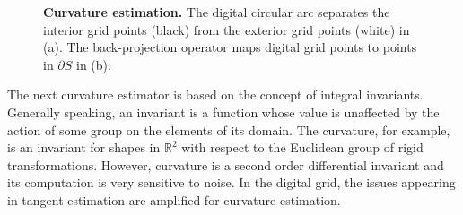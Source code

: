 \begin{figure}
\center
{}\hspace{1em}
\caption{\textbf{Curvature estimation.} The digital circular arc separates the interior grid points (black) from the exterior grid points (white) in (a). The back-projection operator maps digital grid points to points in $\partial S$ in (b). }
\end{figure}

The next curvature estimator is based on the concept of integral invariants. Generally speaking, an invariant is a function whose value is unaffected by the action of some group on the elements of its domain. The curvature, for example, is an invariant for shapes in $\mathbb{R}^2$ with respect to the Euclidean group of rigid transformations. However, curvature is a second order differential invariant and its computation is very sensitive to noise. In the digital grid, the issues appearing in tangent estimation are amplified for curvature estimation.

